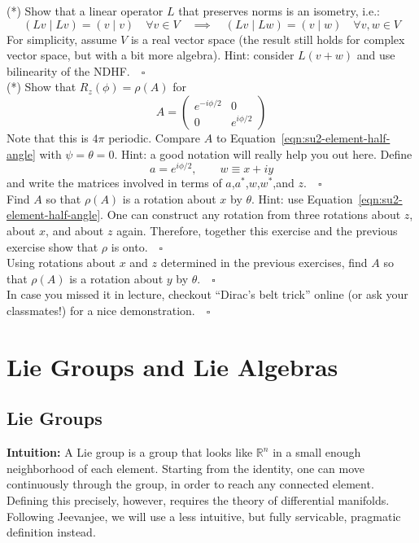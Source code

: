 \documentclass[12pt]{article}
\begin{document}
\exercise (*) Show that a linear operator $L$ that preserves norms is an isometry, i.e.:
$$(Lv \mid Lv)=(v \mid v ) \quad \forall v \in V \quad \implies \quad
(Lv \mid Lw)=(v \mid w ) \quad \forall v,w \in V$$
For simplicity, assume $V$ is a real vector space (the result still
holds for complex vector space, but with a bit more algebra).  Hint:
consider $L(v+w)$ and use bilinearity of the NDHF.$\quad
\square$\\[5pt]

\exercise (*) Show that $R_z(\phi) = \rho(A)$ for
\begin{equation*}
  A = \begin{pmatrix} e^{-i\phi/2} & 0 \\ 0 & e^{i\phi/2} \end{pmatrix}
\end{equation*}
Note that this is $4 \pi$ periodic.  Compare $A$ to Equation~\ref{eqn:su2-element-half-angle} with $\psi=\theta=0$.  Hint: a good notation will really help you out here.  Define
$$a = e^{i\phi/2}, \quad \quad w \equiv x+iy$$
and write the matrices involved in terms of $a$,$a^*$,$w$,$w^*$,and $z$.$\quad \square$\\[5pt]

\exercise Find $A$ so that $\rho(A)$ is a rotation about $x$ by
$\theta$.  Hint: use Equation~\ref{eqn:su2-element-half-angle}.
One can construct any rotation from three rotations about $z$, about $x$, and about $z$ again. Therefore, together this exercise and the previous exercise show that $\rho$ is onto.$\quad \square$\\[5pt]

\exercise Using rotations about $x$ and $z$ determined in the previous exercises, find $A$ so that $\rho(A)$ is a rotation about $y$ by $\theta$.$\quad \square$\\[5pt] 

\exercise In case you missed it in lecture, checkout ``Dirac's belt
trick'' online (or ask your classmates!) for a nice demonstration.$\quad \square$\\[5pt]

\section{Lie Groups and Lie Algebras}
\subsection*{Lie Groups}

\noindent\textbf{Intuition:} A Lie group is a group that looks like
$\mathbb{R}^n$ in a small enough neighborhood of each element.
Starting from the identity, one can move continuously through the
group, in order to reach any connected element.  Defining this
precisely, however, requires the theory of differential manifolds.
Following Jeevanjee, we will use a less intuitive, but fully
servicable, pragmatic definition instead.
\end{document}
